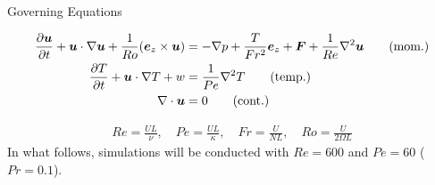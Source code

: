 \documentclass[aspecttatio=169]{beamer}
\begin{document}
\begin{frame}{Governing Equations}

    {\small
    \begin{align}
        \frac{\partial \boldsymbol{u}}{\partial t} + \boldsymbol{u} \cdot \nabla \boldsymbol{u} +
        \frac{1}{Ro}(\boldsymbol{e}_z \times
        \boldsymbol{u}) &= -\nabla p +
        \frac{T}{Fr^2}\boldsymbol{e}_z + \boldsymbol{F} + \frac{1}{Re}\nabla^2\boldsymbol{u} \tag{mom.}\label{eq:momentum}\\
        \frac{\partial T}{\partial t} + \boldsymbol{u} \cdot \nabla T + w &= \frac{1}{Pe}\nabla^2T \tag{temp.} \label{eq:temp} \\
        \nabla \cdot \boldsymbol{u} &= 0 \tag{cont.}\label{eq:cont}
    \end{align}
    
    \begin{align*}
        Re = \frac{UL}{\nu}, \quad Pe = \frac{UL}{\kappa}, \quad Fr =
        \frac{U}{NL}, \quad Ro = \frac{U}{2\Omega L}
    \end{align*}
    In what follows, simulations will be conducted with $Re = 600$ and $Pe = 60$
    ($Pr = 0.1$).
    }

\end{frame}
\end{document}
